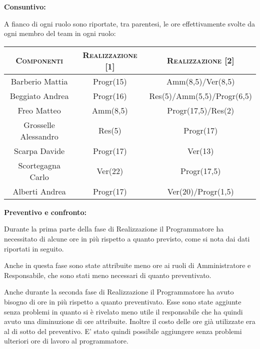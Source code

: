 \documentclass[11pt,a4paper]{article}
\begin{document}
\bigskip \bigskip
\begin{large}\textbf{Consuntivo:}\end{large}
\newline
A fianco di ogni ruolo sono riportate, tra parentesi, le ore effettivamente svolte da ogni membro del team in ogni ruolo:
\\
\begin{center}
\begin{tabular}{|c||c|c|}
\hline
\textsc{Componenti} & \textsc{Realizzazione [1]} & \textsc{Realizzazione [2]} \\ \hline \hline
Barberio Mattia & Progr(15) & Amm(8,5)/Ver(8,5) \\ \hline
Beggiato Andrea & Progr(16) & Res(5)/Amm(5,5)/Progr(6,5) \\ \hline
Freo Matteo & Amm(8,5) & Progr(17,5)/Res(2) \\ \hline
Grosselle Alessandro & Res(5) & Progr(17) \\ \hline
Scarpa Davide & Progr(17) & Ver(13) \\ \hline
Scortegagna Carlo & Ver(22) & Progr(17,5) \\ \hline
Alberti Andrea & Progr(17) & Ver(20)/Progr(1,5) \\ \hline
\end{tabular}
\end{center}

\bigskip \bigskip
\begin{large}\textbf{Preventivo e confronto:}\end{large}
\newline
Durante la prima parte della fase di Realizzazione il Programmatore ha necessitato di alcune ore in più rispetto a quanto previsto, come si nota dai dati riportati in seguito.

Anche in questa fase sono state attribuite meno ore ai ruoli di Amministratore e Responsabile, che sono stati meno necessari di quanto preventivato.

Anche durante la seconda fase di Realizzazione il Programmatore ha avuto bisogno di ore in più rispetto a quanto preventivato. Esse sono state aggiunte senza problemi in quanto si è rivelato meno utile il responsabile che ha quindi avuto una diminuzione di ore attribuite. Inoltre il costo delle ore già utilizzate era al di sotto del preventivo. E' stato quindi possibile aggiungere senza problemi ulteriori ore di lavoro al programmatore.
\end{document}
